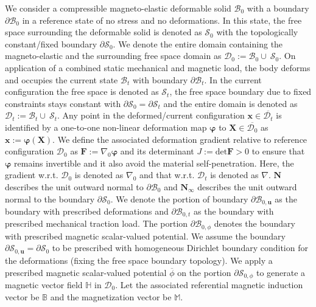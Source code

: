 \documentclass[11pt,a4paper,final]{article}
\begin{document}
We consider a compressible magneto-elastic deformable solid $\mathcal{B}_0$ with a boundary $\partial \mathcal{B}_0$ in a reference state of no stress and no deformations. In this state, the free space surrounding the deformable solid is denoted as $\mathcal{S}_0$ with the topologically constant/fixed boundary $\partial \mathcal{S}_0$. We denote the entire domain containing the magneto-elastic and the surrounding free space domain as $\mathcal{D}_0 := \mathcal{B}_0 \cup \ \mathcal{S}_0$. On application of a combined static mechanical and magnetic load, the body deforms and occupies the current state $\mathcal{B}_t$ with boundary $\partial \mathcal{B}_t$. In the current configuration the free space is denoted as $\mathcal{S}_t$, the free space boundary due to fixed constraints stays constant with $\partial \mathcal{S}_0 = \partial \mathcal{S}_t$ and the entire domain is denoted as $\mathcal{D}_t := \mathcal{B}_t \cup \ \mathcal{S}_t$. Any point in the deformed/current configuration $\mathbf{x} \in \overline{\mathcal{D}_t}$ is identified by a one-to-one non-linear deformation map $\bm{\varphi}$ to $\mathbf{X} \in \overline{\mathcal{D}_0}$ as $\mathbf{x} := \bm{\varphi} (\mathbf{X})$. We define the associated deformation gradient relative to reference configuration $\mathcal{D}_0$ as $\mathbf{F} := \nabla_0 \bm{\varphi}$ and its determinant $J := \text{det} \mathbf{F} > 0$ to ensure that $\bm{\varphi}$ remains invertible and it also avoid the material self-penetration. Here, the gradient w.r.t. $\mathcal{D}_0$ is denoted as $\nabla_0$ and that w.r.t. $\mathcal{D}_t$ is denoted as $\nabla$. $\mathbf{N}$ describes the unit outward normal to $\partial \mathcal{B}_0$ and $\mathbf{N}_{\infty}$ describes the unit outward normal to the boundary $\partial \mathcal{S}_0$. We denote the portion of boundary $\partial \mathcal{B}_{0, \mathbf{u}}$ as the boundary with prescribed deformations and $\partial \mathcal{B}_{0, t}$ as the boundary with prescribed mechanical traction load. The portion $\partial \mathcal{B}_{0, \phi}$ denotes the boundary with prescribed magnetic scalar-valued potential. We assume the boundary $\partial \mathcal{S}_{0,\mathbf{u}} = \partial \mathcal{S}_{0}$ to be prescribed with homogeneous Dirichlet boundary condition for the deformations (fixing the free space boundary topology). We apply a prescribed magnetic scalar-valued potential $\overline{\phi}$ on the portion $\partial \mathcal{S}_{0, \phi}$ to generate a magnetic vector field $\mathbb{H}$ in $\mathcal{D}_0$. Let the associated referential magnetic induction vector be $\mathbb{B}$ and the magnetization vector be $\mathbb{M}$. \par 
\end{document}
